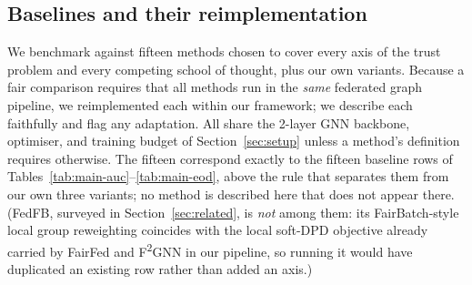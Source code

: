 \documentclass[pdflatex,sn-mathphys-num]{sn-jnl}
\theoremstyle{thmstyleone}%
\theoremstyle{thmstyletwo}%
\theoremstyle{thmstylethree}%
\begin{document}
\subsection{Baselines and their reimplementation}
\label{sec:baselines}
We benchmark against fifteen methods chosen to cover every axis of the trust
problem and every competing school of thought, plus our own variants. Because a
fair comparison requires that all methods run in the \emph{same} federated
graph pipeline, we reimplemented each within our framework; we describe each
faithfully and flag any adaptation. All share the 2-layer GNN backbone,
optimiser, and training budget of Section~\ref{sec:setup} unless a method's
definition requires otherwise. The fifteen correspond exactly to the fifteen
baseline rows of Tables~\ref{tab:main-auc}--\ref{tab:main-eod}, above the rule
that separates them from our own three variants; no method is described here
that does not appear there. (FedFB, surveyed in Section~\ref{sec:related}, is
\emph{not} among them: its FairBatch-style local group reweighting coincides
with the local soft-DPD objective already carried by FairFed and
F\textsuperscript{2}GNN in our pipeline, so running it would have duplicated an
existing row rather than added an axis.)
\end{document}

